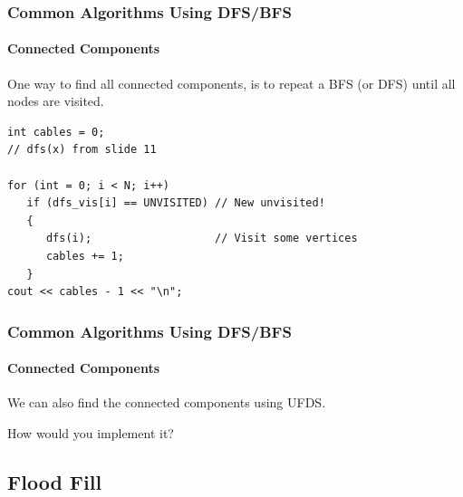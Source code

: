 \begin{frame}[fragile]
  \frametitle{Common Algorithms Using DFS/BFS}
  \framesubtitle{Connected Components}

  {\smaller
    One way to find all connected components, is to repeat
    a BFS (or DFS) until all nodes are visited.

    \begin{exampleblock}{}
\begin{verbatim}
int cables = 0;
// dfs(x) from slide 11

for (int = 0; i < N; i++)
   if (dfs_vis[i] == UNVISITED) // New unvisited!
   {
      dfs(i);                   // Visit some vertices
      cables += 1;
   }
cout << cables - 1 << "\n";
\end{verbatim}
    \end{exampleblock}}

\begin{center}
\end{center}
\end{frame}

\begin{frame}
  \frametitle{Common Algorithms Using DFS/BFS}
  \framesubtitle{Connected Components}

  We can also find the connected components using \alert{UFDS}.

  \bigskip

  How would you implement it?
\end{frame}

\subsection{Flood Fill}

